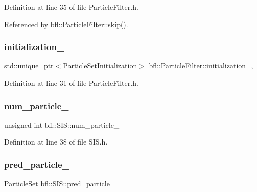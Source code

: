 Definition at line 35 of file Particle\+Filter.\+h.



Referenced by bfl\+::\+Particle\+Filter\+::skip().

\mbox{\label{classbfl_1_1ParticleFilter_aeb2120d4b99b0abc79ec3c2109952322}} 
\subsubsection{\texorpdfstring{initialization\+\_\+}{initialization\_}}
{\footnotesize\ttfamily std\+::unique\+\_\+ptr$<$\mbox{\hyperlink{classbfl_1_1ParticleSetInitialization}{Particle\+Set\+Initialization}}$>$ bfl\+::\+Particle\+Filter\+::initialization\+\_\+\hspace{0.3cm}{\ttfamily [protected]}, {\ttfamily [inherited]}}



Definition at line 31 of file Particle\+Filter.\+h.

\mbox{\label{classbfl_1_1SIS_a80c72cfbb1729fefd040f19bed41af8e}} 
\subsubsection{\texorpdfstring{num\+\_\+particle\+\_\+}{num\_particle\_}}
{\footnotesize\ttfamily unsigned int bfl\+::\+S\+I\+S\+::num\+\_\+particle\+\_\+\hspace{0.3cm}{\ttfamily [protected]}}



Definition at line 38 of file S\+I\+S.\+h.

\mbox{\label{classbfl_1_1SIS_ae0990f026d4fcd9fcb4922647aedf5f0}} 
\subsubsection{\texorpdfstring{pred\+\_\+particle\+\_\+}{pred\_particle\_}}
{\footnotesize\ttfamily \mbox{\hyperlink{classbfl_1_1ParticleSet}{Particle\+Set}} bfl\+::\+S\+I\+S\+::pred\+\_\+particle\+\_\+\hspace{0.3cm}{\ttfamily [protected]}}



